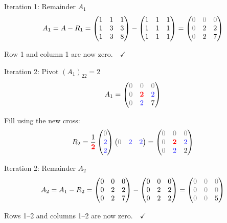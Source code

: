 \documentclass[10pt]{beamer}
\theoremstyle{definition}
\newcommand{\pvt}[1]{{\color{red}\mathbf{#1}}}       %
\newcommand{\crs}[1]{{\color{blue}#1}}                %
\newcommand{\rem}[1]{{\color{gray}#1}}                %
\begin{document}
\begin{frame}{Iteration 1: Remainder $A_1$}
$$A_1 = A - R_1 = \begin{pmatrix}
1 & 1 & 1 \\
1 & 3 & 3 \\
1 & 3 & 8
\end{pmatrix}
- \begin{pmatrix}
1 & 1 & 1 \\
1 & 1 & 1 \\
1 & 1 & 1
\end{pmatrix}
= \begin{pmatrix}
\rem{0} & \rem{0} & \rem{0} \\
\rem{0} & 2 & 2 \\
\rem{0} & 2 & 7
\end{pmatrix}$$

\vfill
Row 1 and column 1 are now \rem{zero}.\ \ $\checkmark$
\end{frame}

\begin{frame}{Iteration 2: Pivot $(A_1)_{22} = 2$}
$$A_1 = \begin{pmatrix}
\rem{0} & \rem{0} & \rem{0} \\
\rem{0} & \pvt{2} & \crs{2} \\
\rem{0} & \crs{2} & 7
\end{pmatrix}$$

\vfill
Fill using the new cross:
$$R_2 = \frac{1}{\pvt{2}}
\begin{pmatrix} \rem{0} \\ \crs{2} \\ \crs{2} \end{pmatrix}
\begin{pmatrix} \rem{0} & \crs{2} & \crs{2} \end{pmatrix}
= \begin{pmatrix}
\rem{0} & \rem{0} & \rem{0} \\
\rem{0} & \pvt{2} & \crs{2} \\
\rem{0} & \crs{2} & 2
\end{pmatrix}$$
\end{frame}

\begin{frame}{Iteration 2: Remainder $A_2$}
$$A_2 = A_1 - R_2 = \begin{pmatrix}
0 & 0 & 0 \\
0 & 2 & 2 \\
0 & 2 & 7
\end{pmatrix}
- \begin{pmatrix}
0 & 0 & 0 \\
0 & 2 & 2 \\
0 & 2 & 2
\end{pmatrix}
= \begin{pmatrix}
\rem{0} & \rem{0} & \rem{0} \\
\rem{0} & \rem{0} & \rem{0} \\
\rem{0} & \rem{0} & 5
\end{pmatrix}$$

\vfill
Rows 1--2 and columns 1--2 are now \rem{zero}.\ \ $\checkmark$
\end{frame}
\end{document}
